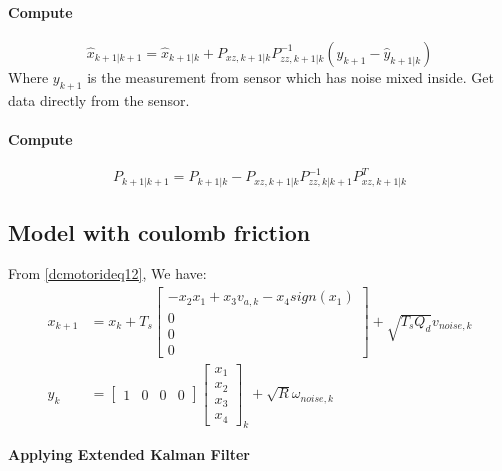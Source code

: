	\paragraph{Compute}
	\[\hat{x}_{k+1|k+1} = \hat{x}_{k+1|k} + P_{xz,k+1|k}P^{-1}_{zz,k+1|k}(y_{k+1}-\hat{y}_{k+1|k})\]
	Where $y_{k+1}$ is the measurement from sensor which has noise mixed inside. Get data directly from the sensor.

	\paragraph{Compute}
	\[P_{k+1|k+1} = P_{k+1|k} - P_{xz,k+1|k}P^{-1}_{zz,k|k+1}P^T_{xz,k+1|k}\]
	
	
	
	
	\subsection{Model with coulomb friction}
	From \autoref{dcmotorideq12}, We have:
	\[
	\begin{split}
		x_{k+1} &= x_k + T_s
		\begin{bmatrix}
			-x_2 x_1 + x_3 v_{a,k} - x_4sign(x_1) \\
			0                                     \\
			0                                     \\
			0                                     
		\end{bmatrix} +\sqrt{T_s Q_d}v_{noise,k}\\
		y_k &= 
		\begin{bmatrix}
			1 & 0 & 0 & 0 
		\end{bmatrix}
		\begin{bmatrix}
			x_1 \\
			x_2 \\
			x_3 \\
			x_4 
		\end{bmatrix}_k+\sqrt{R}\omega_{noise,k}
	\end{split}
	\]
	
	\begin{center}
		\textbf{Applying Extended Kalman Filter}
	\end{center}

